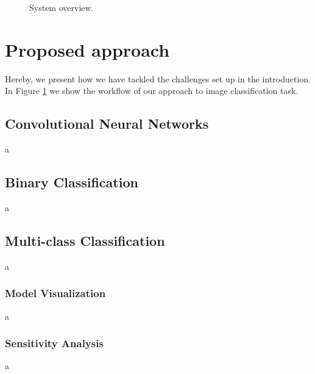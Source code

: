 \begin{figure}
	\begin{center}
	\caption{System overview.}
	\label{fig:1}
	\end{center}
\end{figure}
\section{Proposed approach}
Hereby, we present how we have tackled the challenges set up in the introduction. In Figure \ref{fig:1} we show the workflow of our approach to image classification task.

\subsection{Convolutional Neural Networks}
a
\subsection{Binary Classification}
a
\subsection{Multi-class Classification}
a
\subsubsection{Model Visualization}
a
\subsubsection{Sensitivity Analysis}
a
